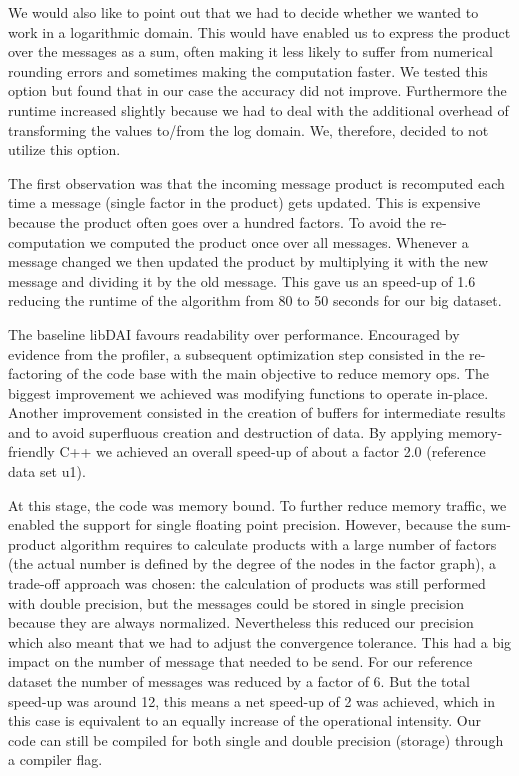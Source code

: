 We would also like to point out that we had to decide whether we wanted to work in a logarithmic domain. This would have enabled us to express the product over the messages as a sum, often making it less likely to suffer from numerical rounding errors and sometimes making the computation faster. We tested this option but found that in our case the accuracy did not improve. Furthermore the runtime increased slightly because we had to deal with the additional overhead of transforming the values to/from the log domain. We, therefore, decided to not utilize this option.

The first observation was that the incoming message product is recomputed each time a message (single factor in the product) gets updated. This is expensive because the product often goes over a hundred factors. To avoid the re-computation we computed the product once over all messages. Whenever a message changed we then updated the product by multiplying it with the new message and dividing it by the old message. This gave us an speed-up of 1.6 reducing the runtime of the algorithm from 80 to 50 seconds for our big dataset.


The baseline libDAI favours readability over performance. Encouraged by evidence from the profiler, a subsequent optimization step consisted in the re-factoring of the code base with the main objective to reduce memory ops. The biggest improvement we achieved was modifying functions to operate in-place. Another improvement consisted in the creation of buffers for intermediate results and to avoid superfluous creation and destruction of data. 
By applying memory-friendly C++ we achieved an overall speed-up of about a factor 2.0 (reference data set u1).

\label{switchToSinglePrecision}
At this stage, the code was memory bound. To further reduce memory traffic, we enabled the support for single floating point precision. However, because the sum-product algorithm requires to calculate products with a large number of factors (the actual number is defined by the degree of the nodes in the factor graph), a trade-off approach was chosen: the calculation of products was still performed with double precision, but the messages could be stored in single precision because they are always normalized. Nevertheless this reduced our precision which also meant that we had to adjust the convergence tolerance. This had a big impact on the number of message that needed to be send. For our reference dataset the number of messages was reduced by a factor of 6. But the total speed-up was around 12, this means a net speed-up of 2 was achieved, which in this case is equivalent to an equally increase of the operational intensity. Our code can still be compiled for both single and double precision (storage) through a compiler flag.


